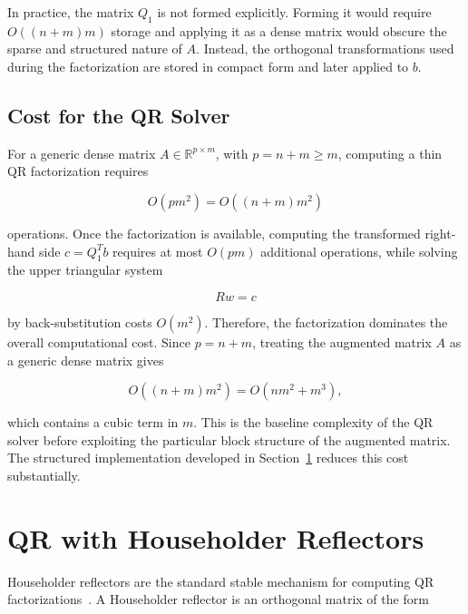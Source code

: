 \documentclass[11pt,a4paper]{article}
\newcommand{\R}{\mathbb{R}}
\begin{document}
In practice, the matrix $Q_1$ is not formed explicitly. Forming it would require 
$O((n+m)m)$ storage and applying it as a dense matrix would obscure the sparse and 
structured nature of $A$. Instead, the orthogonal transformations used during the 
factorization are stored in compact form and later applied to $b$.

\subsection{Cost for the QR Solver}
\label{sec:qr_cost_project}
For a generic dense matrix $A\in\R^{p\times m}$, with $p=n+m\geq m$, computing a thin QR factorization requires

\begin{equation}
    O(pm^2) = O((n+m)m^2)
\end{equation}

operations. Once the factorization is available, computing the transformed right-hand side $c=Q_1^Tb$ requires at most $O(pm)$ additional operations, while solving the upper triangular system

\begin{equation}
    Rw=c
\end{equation}

by back-substitution costs $O(m^2)$.
Therefore, the factorization dominates the overall computational cost. Since $p=n+m$, treating the augmented matrix $A$ as a generic dense matrix gives

\begin{equation}
    O((n+m)m^2) = O(nm^2+m^3),
\end{equation}

which contains a cubic term in $m$.
This is the baseline complexity of the QR solver before exploiting the particular block structure of the augmented matrix. The structured implementation developed in Section~\ref{sec:householder_qr} reduces this cost substantially.


\section{QR with Householder Reflectors}
\label{sec:householder_qr}

Householder reflectors are the standard stable mechanism for computing QR factorizations~\cite{trefethen1997,golub2013}. A Householder reflector is an orthogonal matrix of the form
\end{document}
